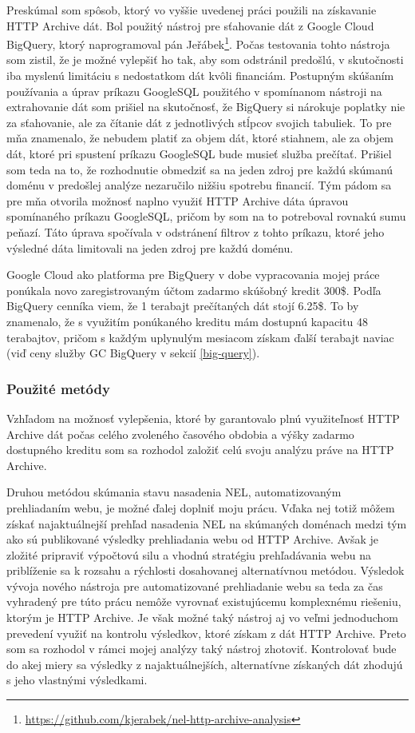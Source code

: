 Preskúmal som spôsob, ktorý vo vyššie uvedenej práci použili na získavanie HTTP Archive dát.
Bol použitý nástroj pre sťahovanie dát z Google Cloud BigQuery, ktorý naprogramoval pán 
Jeřábek\footnote{\href{https://github.com/kjerabek/nel-http-archive-analysis}{https://github.com/kjerabek/nel-http-archive-analysis}}.
Počas testovania tohto nástroja som zistil, že je možné vylepšiť ho tak, aby som odstránil predošlú, v skutočnosti iba myslenú limitáciu s nedostatkom dát kvôli financiám.
Postupným skúšaním používania a úprav príkazu GoogleSQL použitého v spomínanom nástroji na extrahovanie dát som prišiel na skutočnosť, že BigQuery
si nárokuje poplatky nie za sťahovanie, ale za čítanie dát z jednotlivých stĺpcov svojich tabuliek.
To pre mňa znamenalo, že nebudem platiť za objem dát, ktoré stiahnem, ale za objem dát, ktoré pri spustení príkazu GoogleSQL bude musieť služba prečítať.
Prišiel som teda na to, že rozhodnutie obmedziť sa na jeden zdroj pre každú skúmanú doménu v predošlej analýze nezaručilo nižšiu spotrebu financií.
Tým pádom sa pre mňa otvorila možnosť naplno využiť HTTP Archive dáta úpravou spomínaného príkazu GoogleSQL, pričom by som na to potreboval rovnakú sumu peňazí.
Táto úprava spočívala v odstránení filtrov z tohto príkazu, ktoré jeho výsledné dáta limitovali na jeden zdroj pre každú doménu.

Google Cloud ako platforma pre BigQuery v dobe vypracovania mojej práce ponúkala novo zaregistrovaným účtom zadarmo skúšobný
kredit 300\$. 
Podľa BigQuery cenníka viem, že 1 terabajt prečítaných dát stojí 6.25\$.
To by znamenalo, že s využitím ponúkaného kreditu mám dostupnú kapacitu 48 terabajtov, 
pričom s každým uplynulým mesiacom získam ďalší terabajt naviac (viď ceny služby GC BigQuery v sekcií \ref{big-query}).

\subsubsection{Použité metódy}

Vzhľadom na možnosť vylepšenia, ktoré by garantovalo plnú využiteľnosť HTTP Archive dát počas celého zvoleného časového obdobia a výšky zadarmo dostupného kreditu
som sa rozhodol založiť celú svoju analýzu práve na HTTP Archive.

Druhou metódou skúmania stavu nasadenia NEL, automatizovaným prehliadaním webu, je možné ďalej doplniť moju prácu.
Vďaka nej totiž môžem získať najaktuálnejší prehľad nasadenia NEL na skúmaných doménach medzi tým ako sú publikované výsledky prehliadania webu od HTTP Archive.
Avšak je zložité pripraviť výpočtovú silu a vhodnú stratégiu prehľadávania webu na priblíženie sa k rozsahu a rýchlosti dosahovanej alternatívnou metódou.
Výsledok vývoja nového nástroja pre automatizované prehliadanie webu sa teda za čas vyhradený pre túto prácu nemôže vyrovnať existujúcemu komplexnému riešeniu, ktorým je HTTP Archive.
Je však možné taký nástroj aj vo veľmi jednoduchom prevedení využiť na kontrolu výsledkov, ktoré získam z dát HTTP Archive.
Preto som sa rozhodol v rámci mojej analýzy taký nástroj zhotoviť.
Kontrolovať bude do akej miery sa výsledky z najaktuálnejších, alternatívne získaných dát zhodujú s jeho vlastnými výsledkami.

